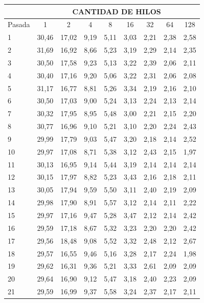 \documentclass[a4paper]{article}
\begin{document}
\begin{table}[H]
\centering
\begin{tabular}{lcccccccc}
         & \multicolumn{8}{c}{\textbf{CANTIDAD DE HILOS}}                    \\ \hline
Pasada   & 1     & 2     & 4     & 8    & 16   & 32   & 64   & 128  \\
1        & 30,46 & 17,02 & 9,19  & 5,11 & 3,03 & 2,21 & 2,38 & 2,58 \\
2        & 31,69 & 16,92 & 8,66  & 5,23 & 3,19 & 2,29 & 2,14 & 2,35 \\
3        & 30,50 & 17,58 & 9,23  & 5,13 & 3,22 & 2,39 & 2,06 & 2,11 \\
4        & 30,40 & 17,16 & 9,20  & 5,06 & 3,22 & 2,31 & 2,06 & 2,08 \\
5        & 31,17 & 16,77 & 8,81  & 5,26 & 3,34 & 2,19 & 2,16 & 2,10 \\
6        & 30,50 & 17,03 & 9,00  & 5,24 & 3,13 & 2,24 & 2,13 & 2,14 \\
7        & 30,32 & 17,95 & 8,95  & 5,48 & 3,00 & 2,21 & 2,15 & 2,20 \\
8        & 30,77 & 16,96 & 9,10  & 5,21 & 3,10 & 2,20 & 2,24 & 2,43 \\
9        & 29,99 & 17,79 & 9,03  & 5,47 & 3,20 & 2,18 & 2,14 & 2,52 \\
10       & 29,97 & 17,08 & 8,71  & 5,38 & 3,12 & 2,43 & 2,15 & 1,97 \\
11       & 30,13 & 16,95 & 9,14  & 5,44 & 3,19 & 2,14 & 2,14 & 2,14 \\
12       & 30,15 & 17,97 & 8,82  & 5,23 & 3,43 & 2,16 & 2,18 & 2,11 \\
13       & 30,05 & 17,94 & 9,59  & 5,50 & 3,11 & 2,40 & 2,19 & 2,09 \\
14       & 29,98 & 17,90 & 8,91  & 5,57 & 3,12 & 2,14 & 2,11 & 2,22 \\
15       & 29,97 & 17,16 & 9,47  & 5,28 & 3,47 & 2,12 & 2,14 & 2,42 \\
16       & 29,59 & 17,18 & 8,67  & 5,32 & 3,23 & 2,20 & 2,20 & 2,42 \\
17       & 29,56 & 18,48 & 9,08  & 5,52 & 3,32 & 2,48 & 2,12 & 2,67 \\
18       & 29,57 & 16,55 & 9,46  & 5,16 & 3,28 & 2,17 & 2,24 & 1,98 \\
19       & 29,62 & 16,31 & 9,36  & 5,21 & 3,33 & 2,61 & 2,09 & 2,09 \\
20       & 29,64 & 16,90 & 9,12  & 5,47 & 3,18 & 2,40 & 2,23 & 2,09 \\
21       & 29,59 & 16,99 & 9,37  & 5,58 & 3,24 & 2,37 & 2,17 & 2,11 \\

\end{tabular}
\end{table}
\end{document}
